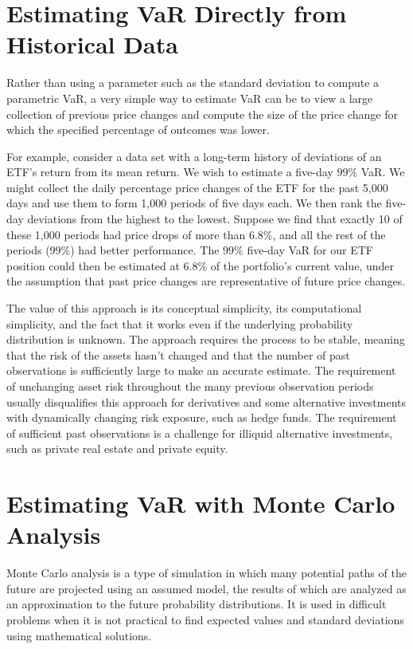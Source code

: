 \documentclass[11pt]{article}
\begin{document}
\section*{Estimating VaR Directly from Historical Data}
Rather than using a parameter such as the standard deviation to compute a parametric VaR, a very simple way to estimate VaR can be to view a large collection of previous price changes and compute the size of the price change for which the specified percentage of outcomes was lower.

For example, consider a data set with a long-term history of deviations of an ETF's return from its mean return. We wish to estimate a five-day $99 \%$ VaR. We might collect the daily percentage price changes of the ETF for the past 5,000 days and use them to form 1,000 periods of five days each. We then rank the five-day deviations from the highest to the lowest. Suppose we find that exactly 10 of these 1,000 periods had price drops of more than $6.8 \%$, and all the rest of the periods (99\%) had better performance. The $99 \%$ five-day VaR for our ETF position could then be estimated at $6.8 \%$ of the portfolio's current value, under the assumption that past price changes are representative of future price changes.

The value of this approach is its conceptual simplicity, its computational simplicity, and the fact that it works even if the underlying probability distribution is unknown. The approach requires the process to be stable, meaning that the risk of the assets hasn't changed and that the number of past observations is sufficiently large to make an accurate estimate. The requirement of unchanging asset risk throughout the many previous observation periods usually disqualifies this approach for derivatives and some alternative investments with dynamically changing risk exposure, such as hedge funds. The requirement of sufficient past observations is a challenge for illiquid alternative investments, such as private real estate and private equity.

\section*{Estimating VaR with Monte Carlo Analysis}
Monte Carlo analysis is a type of simulation in which many potential paths of the future are projected using an assumed model, the results of which are analyzed as an approximation to the future probability distributions. It is used in difficult problems when it is not practical to find expected values and standard deviations using mathematical solutions.
\end{document}
